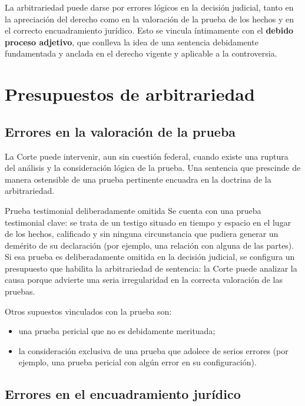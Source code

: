 \documentclass[12pt,oneside]{book}
\begin{document}
La arbitrariedad puede darse por errores lógicos en la decisión judicial, tanto en la apreciación del derecho como en la valoración de la prueba de los hechos y en el correcto encuadramiento jurídico. Esto se vincula íntimamente con el \textbf{debido proceso adjetivo}, que conlleva la idea de una sentencia debidamente fundamentada y anclada en el derecho vigente y aplicable a la controversia.

\section{Presupuestos de arbitrariedad}

\subsection{Errores en la valoración de la prueba}

La Corte puede intervenir, aun sin cuestión federal, cuando existe una ruptura del análisis y la consideración lógica de la prueba. Una sentencia que prescinde de manera ostensible de una prueba pertinente encuadra en la doctrina de la arbitrariedad.

\begin{example}{Prueba testimonial deliberadamente omitida}
Se cuenta con una prueba testimonial clave: se trata de un testigo situado en tiempo y espacio en el lugar de los hechos, calificado y sin ninguna circunstancia que pudiera generar un demérito de su declaración (por ejemplo, una relación con alguna de las partes). Si esa prueba es deliberadamente omitida en la decisión judicial, se configura un presupuesto que habilita la arbitrariedad de sentencia: la Corte puede analizar la causa porque advierte una seria irregularidad en la correcta valoración de las pruebas.
\end{example}

Otros supuestos vinculados con la prueba son:

\begin{itemize}
    \item una prueba pericial que no es debidamente merituada;
    \item la consideración exclusiva de una prueba que adolece de serios errores (por ejemplo, una prueba pericial con algún error en su configuración).
\end{itemize}

\subsection{Errores en el encuadramiento jurídico}
\end{document}
